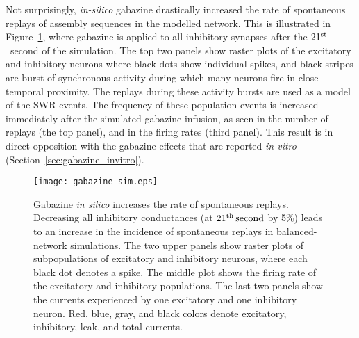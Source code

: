     Not surprisingly, {\it in-silico} gabazine drastically increased the rate
    of spontaneous replays of assembly sequences in the modelled network. This
    is illustrated in Figure~\ref{fig:gabazine_sim}, where gabazine is applied
    to all inhibitory synapses after the $21^{\rm st}$~second of the
    simulation. The top two panels show raster plots of the excitatory and
    inhibitory neurons where black dots show individual spikes, and black
    stripes are burst of synchronous activity during which many neurons fire in
    close temporal proximity. The replays during these activity bursts are used
    as a model of the SWR events. The frequency of these population
    events is increased immediately after the simulated gabazine infusion, as
    seen in the number of replays (the top panel), and in the firing rates
    (third panel). This result is in direct opposition with the gabazine
    effects that are reported {\textit{in vitro}}
    (Section~\ref{sec:gabazine_invitro}).

    \begin{figure}
      \center
      \texttt{[image: gabazine\_sim.eps]}
      \caption{
        Gabazine {\it in silico} increases the rate of spontaneous replays.
        Decreasing all inhibitory conductances (at $21^{\rm th}\, \rm second$
        by 5\%) leads to an increase in the incidence of spontaneous replays in
        balanced-network simulations. The two upper panels show raster plots of
        subpopulations of excitatory and inhibitory neurons, where each black
        dot denotes a spike. The middle plot shows the firing rate of the
        excitatory and inhibitory populations. The last two panels show the
        currents experienced by one excitatory and one inhibitory neuron. Red,
        blue, gray, and black colors denote excitatory, inhibitory, leak, and
        total currents.
            }
    \label{fig:gabazine_sim}
    \end{figure}

